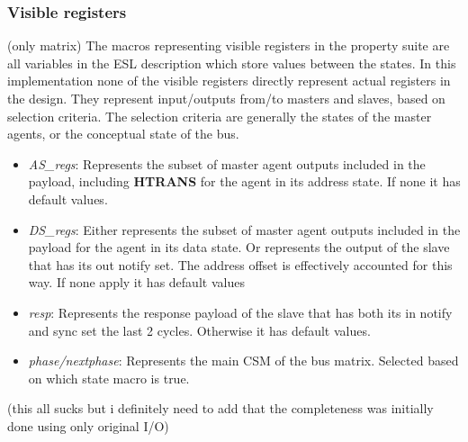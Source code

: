 \subsubsection{Visible registers}
(only matrix)
The macros representing visible registers in the property suite are all variables in the ESL description which store values between the states. In this implementation none of the visible registers directly represent actual registers in the design. They represent input/outputs from/to masters and slaves, based on selection criteria. The selection criteria are generally the states of the master agents, or the conceptual state of the bus. 
\begin{itemize}
 \item \textit{AS\_regs}: Represents the subset of master agent outputs included in the payload, including \textbf{HTRANS} for the agent in its address state. If none it has default values.
 \item \textit{DS\_regs}: Either represents the subset of master agent outputs included in the payload for the agent in its data state. Or represents the output of the slave that has its out notify set. The address offset is effectively accounted for this way. If none apply it has default values
 \item \textit{resp}: Represents the response payload of the slave that has both its in notify and sync set the last 2 cycles. Otherwise it has default values.
 \item \textit{phase/nextphase}: Represents the main CSM of the bus matrix. Selected based on which state macro is true.
\end{itemize} 

(this all sucks but i definitely need to add that the completeness was initially done using only original I/O)


